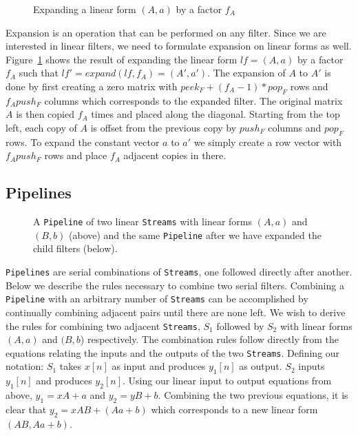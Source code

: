 \begin{figure}
\center
\epsfxsize=3.0in
\caption{Expanding a linear form $(A,a)$ by a factor $f_{A}$}
\label{fig:expanding-a-matrix}
\end{figure}

Expansion is an operation that can be performed on any filter. Since we are interested
in linear filters, we need to formulate expansion on linear forms as well.
Figure~\ref{fig:expanding-a-matrix} shows the result of expanding the linear 
form $lf = (A,a)$ by a factor $f_A$ such that $lf' = expand(lf, f_A) = (A',a')$. 
The expansion of $A$ to $A'$ is done by first creating a zero matrix 
with $peek_{F}+(f_{A}-1)*pop_{F}$ rows and $f_{A}push_F$ columns which corresponds 
to the expanded filter. The original matrix $A$ is then copied $f_{A}$ times and placed along the
diagonal. Starting from the top left, each copy of $A$ is offset from the previous copy 
by $push_{F}$ columns and $pop_{F}$ rows. To expand the constant vector $a$ to $a'$ we simply
create a row vector with $f_{A}push_F$ rows and place $f_A$ adjacent copies in there.

\subsection{Pipelines}

\begin{figure}
\center
\epsfxsize=3.0in
\epsfxsize=3.0in
\caption{A {\tt Pipeline} of two linear {\tt Streams} with linear forms $(A,a)$ and $(B,b)$ (above) and the same {\tt Pipeline} after we have expanded the child filters (below).}
\label{fig:combining-pipeline}
\end{figure}

{\tt Pipelines} are serial combinations of {\tt Streams}, one followed directly after 
another. Below we describe the rules necessary to combine two serial filters. 
Combining a {\tt Pipeline} with an arbitrary number of {\tt Streams} can be accomplished 
by continually combining adjacent pairs until there are none left. 
We wish to derive the rules for combining two adjacent {\tt Streams}, 
$S_{1}$ followed by $S_{2}$ with linear forms $(A,a)$ and $(B,b$) respectively.
The combination rules follow directly from the equations relating the inputs and the outputs of the 
two {\tt Streams}. Defining our notation: $S_{1}$ takes $x[n]$ as input and produces 
$y_1[n]$ as output. $S_{2}$ inputs $y_1[n]$ and produces $y_2[n]$. 
Using our linear input to output equations from above,
$y_1 = xA + a$ and $y_2 = yB + b$. Combining the
two previous equations, it is clear that $y_2 = xAB + (Aa + b)$ 
which corresponds to a new linear form $(AB, Aa+b)$. 

